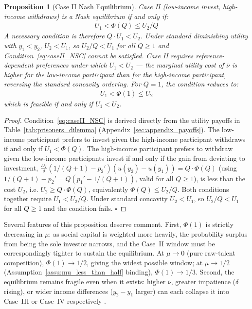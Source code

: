 \documentclass[
    oneside,
    fontsize=10pt,leqno]{article}
\newtheorem{prop}{Proposition}
\begin{document}
\begin{prop}[Case II Nash Equilibrium]\label{prop:caseII}
Case II (low-income invest, high-income withdraws) is a Nash equilibrium if and
only if:
\begin{gather}
U_{1}<\Phi(Q)\leq U_{2}/Q\label{eq:caseII_NSC}
\end{gather}
A necessary condition is therefore $Q\cdot U_{1}<U_{2}$. Under
standard diminishing utility with $y_{1}<y_{2}$, $U_{2}<U_{1}$,
so $U_{2}/Q<U_{1}$ for all $Q\geq1$ and Condition~\eqref{eq:caseII_NSC}
cannot be satisfied. Case II requires reference-dependent preferences
under which $U_{1}<U_{2}$ --- the marginal utility cost of $\overline{\nu}$
is higher for the low-income participant than for the high-income participant, reversing the
standard concavity ordering. For $Q=1$, the condition reduces to:
\begin{align}
U_{1}<\Phi(1)\leq U_{2}\label{eq:caseII_Q1}
\end{align}
which is feasible if and only if $U_{1}<U_{2}$.
\end{prop}

\begin{proof}
Condition~\eqref{eq:caseII_NSC} is derived directly from the utility
payoffs in Table~\ref{tab:prisoners_dilemma} (Appendix~\ref{sec:appendix_payoffs}). The low-income participant
prefers to invest given the high-income participant withdraws if and only if
$U_{1}<\Phi(Q)$. The high-income participant prefers to withdraw given the
low-income participants invest if and only if the gain from deviating to investment,
$\frac{D_{T}}{\delta}(1/(Q+1)-p_{2}')(u(y_{2})-u(y_{1}))=Q\cdot\Phi(Q)$
(using $1/(Q+1)-p_{2}'=Q(p_{1}'-1/(Q+1))$, valid for all $Q\geq1$),
is less than the cost $U_{2}$, i.e. $U_{2}\geq Q\cdot\Phi(Q)$,
equivalently $\Phi(Q)\leq U_{2}/Q$. Both conditions together require
$U_{1}<U_{2}/Q$. Under standard concavity $U_{2}<U_{1}$, so
$U_{2}/Q<U_{1}$ for all $Q\geq1$ and the condition fails. $\square$
\end{proof}

\medskip

Several features of this proposition deserve comment. First,
$\Phi(1)$ is strictly decreasing in $\mu$: as social capital is
weighted more heavily, the probability surplus from being the sole
investor narrows, and the Case~II window must be correspondingly
tighter to sustain the equilibrium. At $\mu\to0$ (pure raw-talent
competition), $\Phi(1)\to1/2$, giving the widest possible window;
at $\mu\to1/2$ (Assumption~\ref{assu:mu_less_than_half} binding),
$\Phi(1)\to1/3$. Second, the equilibrium remains fragile even when
it exists: higher $\overline{\nu}$, greater impatience ($\delta$
rising), or wider income differences ($y_{2}-y_{1}$ larger) can each
collapse it into Case~III or Case~IV respectively
\citep{MijsMeritocracy2020,MijsParadox2019}.
\end{document}
